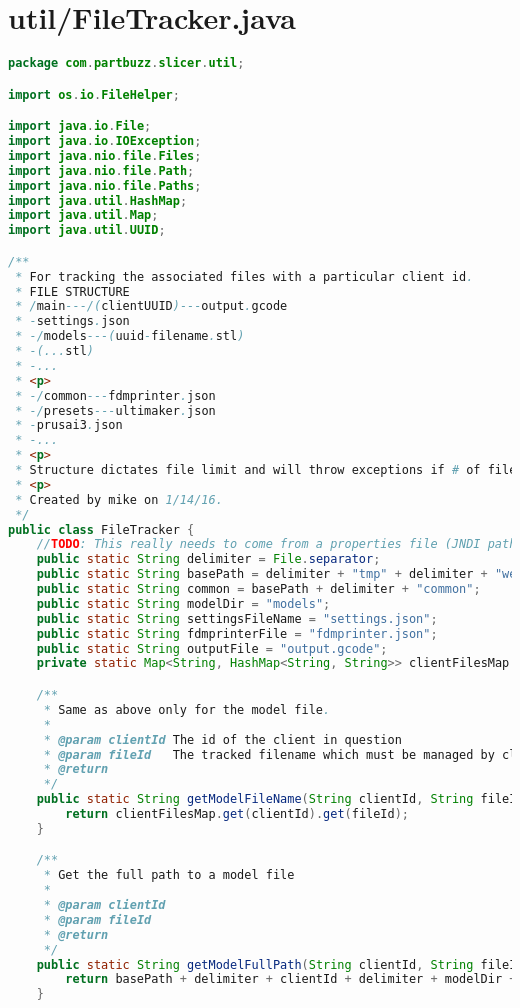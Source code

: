 \section{util/FileTracker.java}
\begin{lstlisting}[language=Java, label={lst:FileTracker}, caption=FileTracker tracks all of the files uploaded to the server to a series of hash maps. It also issues unique identifiers for each file that gets uploaded so that they may be tracked and accessed simply.]
package com.partbuzz.slicer.util;

import os.io.FileHelper;

import java.io.File;
import java.io.IOException;
import java.nio.file.Files;
import java.nio.file.Path;
import java.nio.file.Paths;
import java.util.HashMap;
import java.util.Map;
import java.util.UUID;

/**
 * For tracking the associated files with a particular client id.
 * FILE STRUCTURE
 * /main---/(clientUUID)---output.gcode
 * -settings.json
 * -/models---(uuid-filename.stl)
 * -(...stl)
 * -...
 * <p>
 * -/common---fdmprinter.json
 * -/presets---ultimaker.json
 * -prusai3.json
 * -...
 * <p>
 * Structure dictates file limit and will throw exceptions if # of files goes above limit.
 * <p>
 * Created by mike on 1/14/16.
 */
public class FileTracker {
    //TODO: This really needs to come from a properties file (JNDI path to properties file)
    public static String delimiter = File.separator;
    public static String basePath = delimiter + "tmp" + delimiter + "webslicer";
    public static String common = basePath + delimiter + "common";
    public static String modelDir = "models";
    public static String settingsFileName = "settings.json";
    public static String fdmprinterFile = "fdmprinter.json";
    public static String outputFile = "output.gcode";
    private static Map<String, HashMap<String, String>> clientFilesMap = new HashMap<>();

    /**
     * Same as above only for the model file.
     *
     * @param clientId The id of the client in question
     * @param fileId   The tracked filename which must be managed by client
     * @return
     */
    public static String getModelFileName(String clientId, String fileId) {
        return clientFilesMap.get(clientId).get(fileId);
    }

    /**
     * Get the full path to a model file
     *
     * @param clientId
     * @param fileId
     * @return
     */
    public static String getModelFullPath(String clientId, String fileId) {
        return basePath + delimiter + clientId + delimiter + modelDir + delimiter + getModelFileName(clientId, fileId);
    }


\end{lstlisting}
